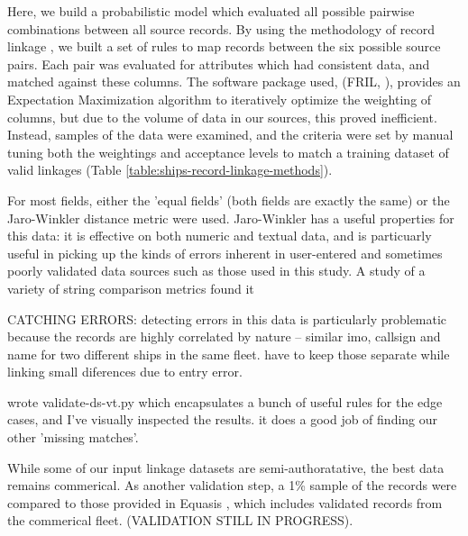 Here, we build a probabilistic model which evaluated all possible pairwise combinations between all source records. By using the methodology of record linkage \cite{Christen2012}, we built a set of rules to map records between the six possible source pairs. Each pair was evaluated for attributes which had consistent data, and matched against these columns. The software package used, (FRIL, \cite{Jurczyk2008fril}), provides an Expectation Maximization algorithm to iteratively optimize the weighting of columns, but due to the volume of data in our sources, this proved inefficient. Instead, samples of the data were examined, and the criteria were set by manual tuning both the weightings and acceptance levels to match a training dataset of valid linkages (Table \ref{table:ships-record-linkage-methods}). %

For most fields, either the 'equal fields' (both fields are exactly the same) or the Jaro-Winkler distance metric were used. Jaro-Winkler has a useful properties for this data: it is effective on both numeric and textual data, and is particuarly useful in picking up the kinds of errors inherent in user-entered and sometimes poorly validated data sources such as those used in this study. A study of a variety of string comparison metrics \cite{Cohen2003} found it %

CATCHING ERRORS:
 detecting errors in this data is particularly problematic because the records are highly correlated by nature -- similar imo, callsign and name for two different ships in the same fleet. have to keep those separate while linking small diferences due to entry error.

 wrote validate-ds-vt.py which encapsulates a bunch of useful rules for the edge cases, and I've visually inspected the results. it does a good job of finding our other 'missing matches'.

While some of our input linkage datasets are semi-authoratative, the best data remains commerical. As another validation step, a 1\% sample of the records were compared to those provided in Equasis \cite{Equasis2011}, which includes validated records from the commerical fleet. (VALIDATION STILL IN PROGRESS).


